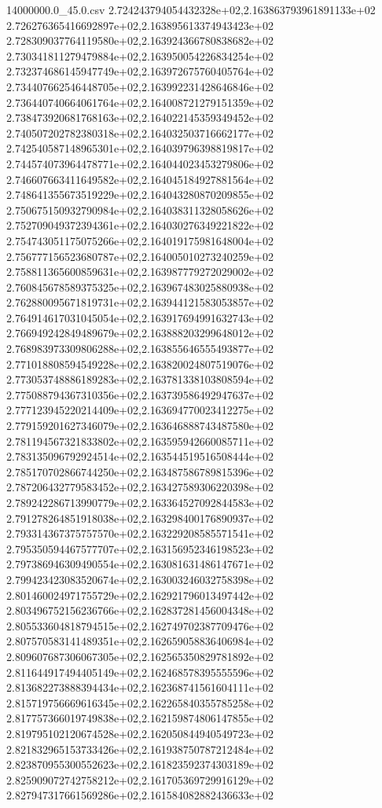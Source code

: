 \begin{filecontents*}{14000000.0_45.0.csv}
2.724243794054432328e+02,2.163863793961891133e+02
2.726276365416692897e+02,2.163895613374943423e+02
2.728309037764119580e+02,2.163924366780838682e+02
2.730341811279479884e+02,2.163950054226834254e+02
2.732374686145947749e+02,2.163972675760405764e+02
2.734407662546448705e+02,2.163992231428646846e+02
2.736440740664061764e+02,2.164008721279151359e+02
2.738473920681768163e+02,2.164022145359349452e+02
2.740507202782380318e+02,2.164032503716662177e+02
2.742540587148965301e+02,2.164039796398819817e+02
2.744574073964478771e+02,2.164044023453279806e+02
2.746607663411649582e+02,2.164045184927881564e+02
2.748641355673519229e+02,2.164043280870209855e+02
2.750675150932790984e+02,2.164038311328058626e+02
2.752709049372394361e+02,2.164030276349221822e+02
2.754743051175075266e+02,2.164019175981648004e+02
2.756777156523680787e+02,2.164005010273240259e+02
2.758811365600859631e+02,2.163987779272029002e+02
2.760845678589375325e+02,2.163967483025880938e+02
2.762880095671819731e+02,2.163944121583053857e+02
2.764914617031045054e+02,2.163917694991632743e+02
2.766949242849489679e+02,2.163888203299648012e+02
2.768983973309806288e+02,2.163855646555493877e+02
2.771018808594549228e+02,2.163820024807519076e+02
2.773053748886189283e+02,2.163781338103808594e+02
2.775088794367310356e+02,2.163739586492947637e+02
2.777123945220214409e+02,2.163694770023412275e+02
2.779159201627346079e+02,2.163646888743487580e+02
2.781194567321833802e+02,2.163595942660085711e+02
2.783135096792924514e+02,2.163544519516508444e+02
2.785170702866744250e+02,2.163487586789815396e+02
2.787206432779583452e+02,2.163427589306220398e+02
2.789242286713990779e+02,2.163364527092844583e+02
2.791278264851918038e+02,2.163298400176890937e+02
2.793314367375757570e+02,2.163229208585571541e+02
2.795350594467577707e+02,2.163156952346198523e+02
2.797386946309490554e+02,2.163081631486147671e+02
2.799423423083520674e+02,2.163003246032758398e+02
2.801460024971755729e+02,2.162921796013497442e+02
2.803496752156236766e+02,2.162837281456004348e+02
2.805533604818794515e+02,2.162749702387709476e+02
2.807570583141489351e+02,2.162659058836406984e+02
2.809607687306067305e+02,2.162565350829781892e+02
2.811644917494405149e+02,2.162468578395555596e+02
2.813682273888394434e+02,2.162368741561604111e+02
2.815719756669616345e+02,2.162265840355785258e+02
2.817757366019749838e+02,2.162159874806147855e+02
2.819795102120674528e+02,2.162050844940549723e+02
2.821832965153733426e+02,2.161938750787212484e+02
2.823870955300552623e+02,2.161823592374303189e+02
2.825909072742758212e+02,2.161705369729916129e+02
2.827947317661569286e+02,2.161584082882436633e+02

\end{filecontents*}
